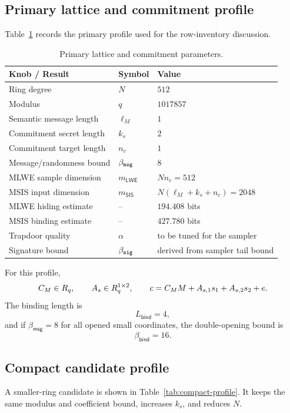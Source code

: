 \subsection{Primary lattice and commitment profile}
Table~\ref{tab:lattice-params} records the primary profile used for the row-inventory discussion.

\begin{table}[H]
\centering
\renewcommand{\arraystretch}{1.15}
\begin{tabular}{@{}lll@{}}
\toprule
\textbf{Knob / Result} & \textbf{Symbol} & \textbf{Value} \\
\midrule
Ring degree & \(N\) & \(512\) \\
Modulus & \(q\) & \(1017857\) \\
Semantic message length & \(\ell_M\) & \(1\) \\
Commitment secret length & \(k_s\) & \(2\) \\
Commitment target length & \(n_c\) & \(1\) \\
Message/randomness bound & \(\beta_{\mathtt{msg}}\) & \(8\) \\
MLWE sample dimension & \(m_{\mathsf{LWE}}\) & \(Nn_c=512\) \\
MSIS input dimension & \(m_{\mathsf{SIS}}\) & \(N(\ell_M+k_s+n_c)=2048\) \\
MLWE hiding estimate & -- & \(194.408\) bits \\
MSIS binding estimate & -- & \(427.780\) bits \\
\midrule
Trapdoor quality & \(\alpha\) & to be tuned for the sampler \\
Signature bound & \(\beta_{\mathtt{sig}}\) & derived from sampler tail bound \\
\bottomrule
\end{tabular}
\caption{Primary lattice and commitment parameters.}
\label{tab:lattice-params}
\end{table}

For this profile,
\[
  C_M\in R_q,
  \qquad
  A_s\in R_q^{1\times2},
  \qquad
  c=C_MM+A_{s,1}s_1+A_{s,2}s_2+e.
\]
The binding length is
\[
  L_{\mathsf{bind}}=4,
\]
and if \(\beta_{\mathsf{msg}}=8\) for all opened small coordinates, the double-opening bound is
\[
  \beta_{\mathsf{bind}}=16.
\]

\subsection{Compact candidate profile}
A smaller-ring candidate is shown in Table~\ref{tab:compact-profile}.  It keeps the same modulus and coefficient
bound, increases \(k_s\), and reduces \(N\).

